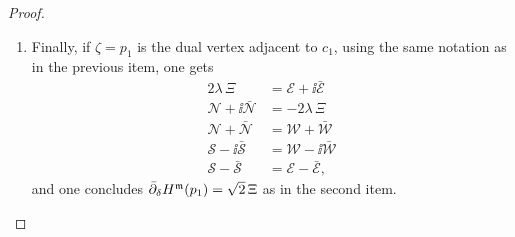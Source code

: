 \documentclass[12pt,oneside,english]{amsart}
\numberwithin{equation}{section}
\numberwithin{figure}{section}
\theoremstyle{plain}
\theoremstyle{plain}
\theoremstyle{plain}
\theoremstyle{plain}
\theoremstyle{remark}
\theoremstyle{definition}
\theoremstyle{plain}
\theoremstyle{plain}
\numberwithin{thm}{section}
\begin{document}
\begin{proof}
\begin{enumerate}
\begin{align*}
\mathcal{S}-\bar{\mathcal{S}} & =\mathcal{E}-\bar{\mathcal{E}}\\
\mathcal{N}+\ii \bar{\mathcal{N}} & =\mathcal{E}+\ii \bar{\mathcal{E}}.
\end{align*}
As in the first item, an appropriate linear combination of these 
yields $\ddeebar H^\mdl(\zeta) = 0$.
\item Finally, if $\zeta=p_1$ is the dual vertex adjacent to 
$c_{1}$, using the same notation as in the previous item, one gets
\begin{align*}
2\lambda \, \Xi & =\mathcal{E} + \ii \bar{\mathcal{E}}\\
\mathcal{N} + \ii \bar{\mathcal{N}} & = - 2 \lambda \, \Xi\\
\mathcal{N} + \bar{\mathcal{N}} & = \mathcal{W} + \bar{\mathcal{W}}\\
\mathcal{S} - \ii \bar{\mathcal{S}} & = \mathcal{W} - \ii \bar{\mathcal{W}}\\
\mathcal{S} - \bar{\mathcal{S}} & = \mathcal{E} - \bar{\mathcal{E}},
\end{align*}
and one concludes ${{\bar{\partial}}}_{{\delta}} H^{\mathfrak{m}}(p_1) = \sqrt{2} \, \Xi$
as in the second item. 
\end{enumerate}%
\end{proof}
\end{document}
